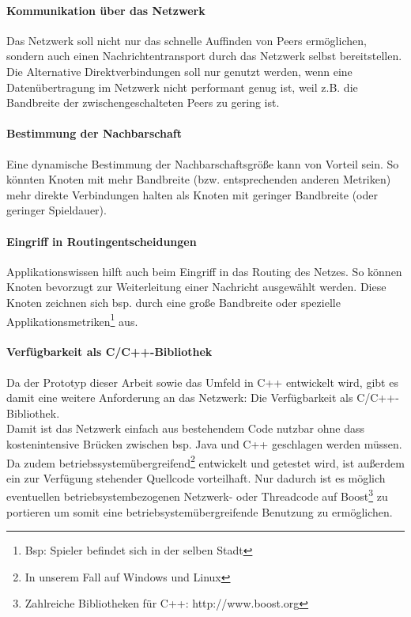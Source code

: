 \paragraph{Kommunikation über das Netzwerk} Das Netzwerk soll nicht nur das schnelle Auffinden von Peers ermöglichen, sondern auch einen Nachrichtentransport durch das Netzwerk selbst bereitstellen. Die Alternative Direktverbindungen soll nur genutzt werden, wenn eine Datenübertragung im Netzwerk nicht performant genug ist, weil z.B. die Bandbreite der zwischengeschalteten Peers zu gering ist.

\paragraph{Bestimmung der Nachbarschaft} Eine dynamische Bestimmung der Nachbarschaftsgröße kann von Vorteil sein. So könnten Knoten mit mehr Bandbreite (bzw. entsprechenden anderen Metriken) mehr direkte Verbindungen halten als Knoten mit geringer Bandbreite (oder geringer Spieldauer).

\paragraph{Eingriff in Routingentscheidungen} Applikationswissen hilft auch beim Eingriff in das Routing des Netzes. So können Knoten bevorzugt zur Weiterleitung einer Nachricht ausgewählt werden. Diese Knoten zeichnen sich bsp. durch eine große Bandbreite oder spezielle Applikationsmetriken\footnote{Bsp: Spieler befindet sich in der selben Stadt} aus.

\paragraph{Verfügbarkeit als C/C++-Bibliothek} Da der Prototyp dieser Arbeit sowie das Umfeld in C++ entwickelt wird, gibt es damit eine weitere Anforderung an das Netzwerk: Die Verfügbarkeit als C/C++-Bibliothek.\\
Damit ist das Netzwerk einfach aus bestehendem Code nutzbar ohne dass kostenintensive Brücken zwischen bsp. Java und C++ geschlagen werden müssen. Da zudem betriebssystemübergreifend\footnote{In unserem Fall auf Windows und Linux} entwickelt und getestet wird, ist außerdem ein zur Verfügung stehender Quellcode vorteilhaft. Nur dadurch ist es möglich eventuellen betriebsystembezogenen Netzwerk- oder Threadcode auf  Boost\footnote{Zahlreiche Bibliotheken für C++: http://www.boost.org} zu portieren um somit eine betriebsystemübergreifende Benutzung zu ermöglichen.

